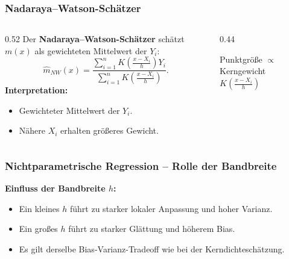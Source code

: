\documentclass{beamer}
\begin{document}
	
	\begin{frame}
		\frametitle{Nadaraya--Watson-Schätzer}
		
		\begin{columns}[T]
			\begin{column}{0.52\textwidth}
				Der \textbf{Nadaraya--Watson-Schätzer} schätzt $m(x)$ als gewichteten Mittelwert der $Y_i$:
				\[
					\hat{m}_{NW}(x) =
					\frac{\displaystyle\sum_{i=1}^n K\!\left(\frac{x - X_i}{h}\right) Y_i}
					{\displaystyle\sum_{i=1}^n K\!\left(\frac{x - X_i}{h}\right)}.
				\]
				\textbf{Interpretation:}
				\begin{itemize}
					\itemsep4pt
					\item Gewichteter Mittelwert der $Y_i$.
					\item Nähere $X_i$ erhalten größeres Gewicht.
				\end{itemize}
			\end{column}
			\begin{column}{0.44\textwidth}
				\centering
				{\tiny Punktgröße $\propto$ Kerngewicht $K\!\left(\tfrac{x-X_i}{h}\right)$}
			\end{column}
		\end{columns}
	\end{frame}
	
	
	\begin{frame}
		\frametitle{Nichtparametrische Regression – Rolle der Bandbreite}
		
		\textbf{Einfluss der Bandbreite $h$:}
		\begin{itemize}
			\itemsep8pt
			\item Ein kleines $h$ führt zu starker lokaler Anpassung und hoher Varianz.
			\item Ein großes $h$ führt zu starker Glättung und höherem Bias.
			\item Es gilt derselbe Bias-Varianz-Tradeoff wie bei der Kerndichteschätzung.
		\end{itemize}
	\end{frame}
	
\end{document}
